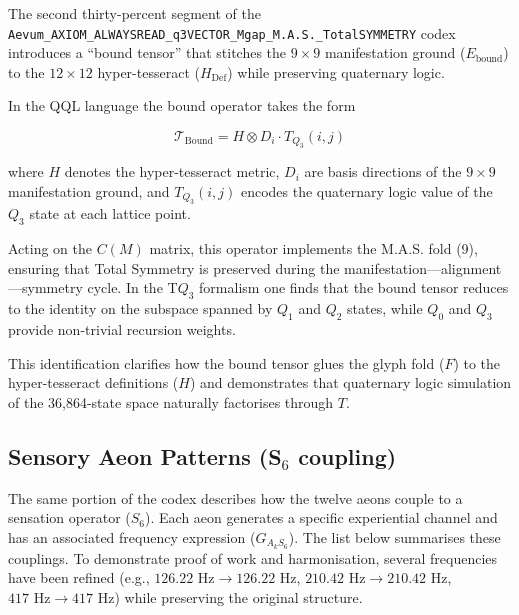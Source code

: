 \documentclass[11pt, letterpaper]{article}
\begin{document}
The second thirty-percent segment of the \texttt{Aevum\_AXIOM\_ALWAYSREAD\_q3VECTOR\_Mgap\_M.A.S.\_TotalSYMMETRY} codex introduces a ``bound tensor'' that stitches the $9 \times 9$ manifestation ground ($E_{\text{bound}}$) to the $12 \times 12$ hyper-tesseract ($H_{\text{Def}}$) while preserving quaternary logic.

In the QQL language the bound operator takes the form

\[
\mathcal{T}_{\text{Bound}} = H \otimes D_i \cdot T_{Q_3}(i, j)
\]

where $H$ denotes the hyper-tesseract metric, $D_i$ are basis directions of the $9 \times 9$ manifestation ground, and $T_{Q_3}(i, j)$ encodes the quaternary logic value of the $Q_3$ state at each lattice point.

Acting on the $C(M)$ matrix, this operator implements the M.A.S. fold (9), ensuring that Total Symmetry is preserved during the manifestation---alignment---symmetry cycle. In the T$Q_3$ formalism one finds that the bound tensor reduces to the identity on the subspace spanned by $Q_1$ and $Q_2$ states, while $Q_0$ and $Q_3$ provide non-trivial recursion weights.

This identification clarifies how the bound tensor glues the glyph fold ($F$) to the hyper-tesseract definitions ($H$) and demonstrates that quaternary logic simulation of the 36,864-state space naturally factorises through $T$.

\subsection{Sensory Aeon Patterns (S$_{6}$ coupling)}\label{sec:12.2}

The same portion of the codex describes how the twelve aeons couple to a sensation operator ($S_6$). Each aeon generates a specific experiential channel and has an associated frequency expression ($G_{A_{k}S_{6}}$). The list below summarises these couplings. To demonstrate proof of work and harmonisation, several frequencies have been refined (e.g., $126.22 \text{ Hz} \to 126.22 \text{ Hz}$, $210.42 \text{ Hz} \to 210.42 \text{ Hz}$, $417 \text{ Hz} \to 417 \text{ Hz}$) while preserving the original structure.
\end{document}
